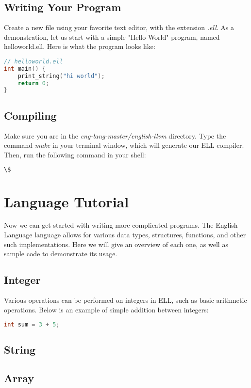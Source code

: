 \documentclass{article}
\begin{document}
\subsection{Writing Your Program}
Create a new file using your favorite text editor, with the extension \textit{.ell}. As a demonstration, let us start with a simple "Hello World" program, named helloworld.ell. Here is what the program looks like: \newline
\begin{lstlisting}[language=C]
// helloworld.ell
int main() {
    print_string("hi world");
    return 0;
}
\end{lstlisting}

\subsection{Compiling}
Make sure you are in the \textit{eng-lang-master/english-llvm} directory. Type the command \textit{make} in your terminal window, which will generate our ELL compiler. Then, run the following command in your shell:
\begin{lstlisting}[language=bash]
 \$ 
\end{lstlisting}

\newpage
\section{Language Tutorial}
Now we can get started with writing more complicated programs. The English Language language allows for various data types, structures, functions, and other such implementations. Here we will give an overview of each one, as well as sample code to demonstrate its usage.
\subsection{Integer}
Various operations can be performed on integers in ELL, such as basic arithmetic operations. Below is an example of simple addition between integers:
\begin{lstlisting}[language=C]
int sum = 3 + 5;
\end{lstlisting}

\subsection{String}

\subsection{Array}
\end{document}
